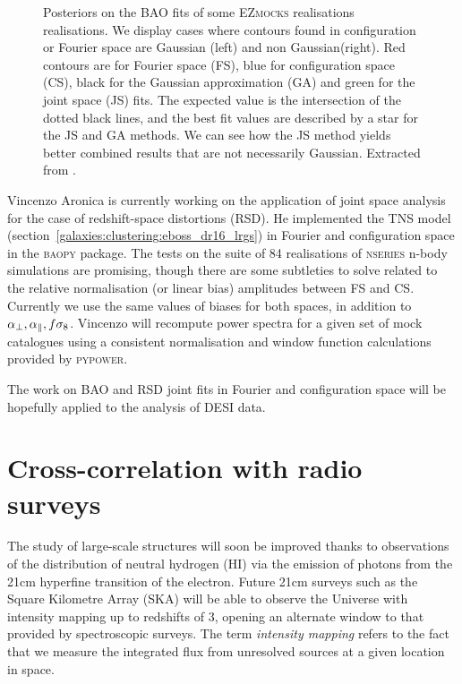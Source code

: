 \begin{figure}
  \caption{Posteriors on the BAO fits of some \textsc{EZmocks} realisations 
  realisations. We display cases where contours found in 
  configuration or Fourier space are Gaussian (left) and non Gaussian(right). 
  Red contours are for Fourier space (FS), blue for configuration space (CS), 
  black for the Gaussian approximation (GA) and green for the joint space (JS) fits.  
  The expected value is the intersection of the dotted black lines,
  and the best fit values are described by a star for the JS and GA methods. 
  We can see how the JS method yields better combined results that are not necessarily Gaussian.
  Extracted from \cite{dumerchatBaryonAcousticOscillations2022a}. 
  }
  \label{fig:non_gaussian_contours}
  \end{figure}

Vincenzo Aronica is currently working on the application of joint space analysis 
for the case of redshift-space distortions (RSD). 
He implemented the TNS model (section~\ref{galaxies:clustering:eboss_dr16_lrgs}) 
in Fourier and configuration space in the \textsc{baopy} package. 
The tests on the suite of 84 realisations of \textsc{nseries} n-body simulations are 
promising, though there are some subtleties to solve related to the relative normalisation 
(or linear bias) amplitudes between FS and CS. Currently we use the same values of biases 
for both spaces, in addition to ${\alpha_\perp}, {\alpha_\parallel}, f\sigma_8$. 
Vincenzo will recompute power spectra for a given set of mock 
catalogues using a consistent normalisation and window function calculations provided by 
\textsc{pypower}. 

The work on BAO and RSD joint fits in Fourier and configuration space 
will be hopefully applied to the analysis of DESI data. 


\section{Cross-correlation with radio surveys}
\label{galaxies:radio}

The study of large-scale structures will soon be improved thanks to 
observations of the distribution of neutral hydrogen (HI) via the emission 
of photons from the 21cm hyperfine transition of the electron. 
Future 21cm surveys such as the Square Kilometre Array (SKA) will be able to 
observe the Universe with intensity mapping up to redshifts of 3, 
opening an alternate window to that provided by spectroscopic surveys. 
The term \emph{intensity mapping} refers to the fact that we measure 
the integrated flux from unresolved sources at a given location in space.


